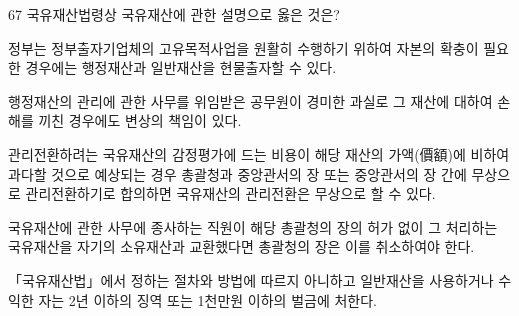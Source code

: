 \begin{question}{67}
국유재산법령상 국유재산에 관한 설명으로 옳은 것은?
\begin{choices}
  \item 정부는 정부출자기업체의 고유목적사업을 원활히 수행하기 위하여 자본의 확충이 필요한 경우에는 행정재산과 일반재산을 현물출자할 수 있다.
  \item 행정재산의 관리에 관한 사무를 위임받은 공무원이 경미한 과실로 그 재산에 대하여 손해를 끼친 경우에도 변상의 책임이 있다.
  \item 관리전환하려는 국유재산의 감정평가에 드는 비용이 해당 재산의 가액(價額)에 비하여 과다할 것으로 예상되는 경우 총괄청과 중앙관서의 장 또는 중앙관서의 장 간에 무상으로 관리전환하기로 합의하면 국유재산의 관리전환은 무상으로 할 수 있다.
  \item 국유재산에 관한 사무에 종사하는 직원이 해당 총괄청의 장의 허가 없이 그 처리하는 국유재산을 자기의 소유재산과 교환했다면 총괄청의 장은 이를 취소하여야 한다.
  \item 「국유재산법」에서 정하는 절차와 방법에 따르지 아니하고 일반재산을 사용하거나 수익한 자는 2년 이하의 징역 또는 1천만원 이하의 벌금에 처한다.
\end{choices}
\end{question}

